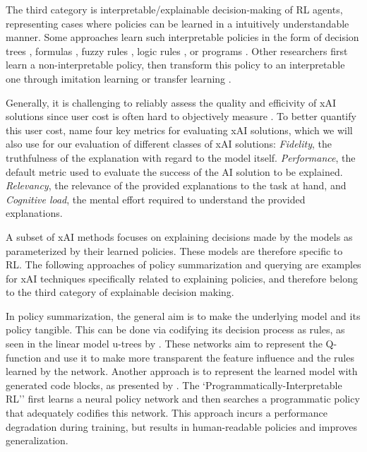 \documentclass[twoside,11pt]{article}
\begin{document}
\begin{enumerate}
The third category is interpretable/explainable decision-making of RL agents, representing cases where policies can be learned in a intuitively understandable manner. Some approaches learn such interpretable policies in the form of decision trees \citep{likmeta2020combining,silva2020optimization,topin2021iterative}, formulas \citep{hein2018interpretable,hein2019generating}, fuzzy rules \citep{akrour2019towards,hein2017particle,zhang2021kogun}, logic rules \citep{jiang2019neural}, or programs \citep{sun2019program,verma2019imitation}. Other researchers first learn a non-interpretable policy, then transform this policy to an interpretable one through imitation learning or transfer learning \citep{bastani2018verifiable,VermaEtAl:2018:ProgrammaticallyInterpretableRL}.

Generally, it is challenging to reliably assess the quality and efficivity of xAI solutions since user cost is often hard to objectively measure \citep{bruneau2002eyes}. To better quantify this user cost, \cite{milani2022survey} name four key metrics for evaluating xAI solutions, which we will also use for our evaluation of different classes of xAI solutions: \emph{Fidelity}, the truthfulness of the explanation with regard to the model itself. \emph{Performance}, the default metric used to evaluate the success of the AI solution to be explained. \emph{Relevancy}, the relevance of the provided explanations to the task at hand, and \emph{Cognitive load}, the mental effort required to understand the provided explanations. 

A subset of xAI methods focuses on explaining decisions made by the models as parameterized by their learned policies. These models are therefore specific to RL. The following approaches of policy summarization and querying are examples for xAI techniques specifically related to explaining policies, and therefore belong to the third category of explainable decision making. 

In policy summarization, the general aim is to make the underlying model and its policy tangible. This can be done via codifying its decision process as rules, as seen in the linear model u-trees by \citet{LiuEtAl:2018:LinearModelUTrees}. These networks aim to represent the Q-function and use it to make more transparent the feature influence and the rules learned by the network. 
Another approach is to represent the learned model with generated code blocks, as presented by \citet{VermaEtAl:2018:ProgrammaticallyInterpretableRL}. The `Programmatically-Interpretable RL'' first learns a neural policy network and then searches a programmatic policy that adequately codifies this network. This approach incurs a performance degradation during training, but results in human-readable policies and improves generalization. 


\end{enumerate}
\end{document}
